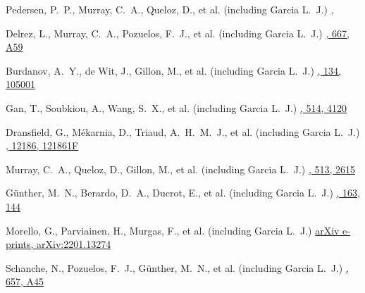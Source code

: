 {Pedersen, P.~P., Murray, C.~A., Queloz, D., et al. (including Garcia L.~J.)}
{\href{https://ui.adsabs.harvard.edu/abs/2022MNRAS.tmp.2950P}{\mnras,}}

{Delrez, L., Murray, C.~A., Pozuelos, F.~J., et al. (including Garcia L.~J.)}
{\href{https://ui.adsabs.harvard.edu/abs/2022A\&A...667A..59D}{\aap, 667, A59}}

{Burdanov, A.~Y., de Wit, J., Gillon, M., et al. (including Garcia L.~J.)}
{\href{https://ui.adsabs.harvard.edu/abs/2022PASP..134j5001B}{\pasp, 134, 105001}}

{Gan, T., Soubkiou, A., Wang, S.~X., et al. (including Garcia L.~J.)}
{\href{https://ui.adsabs.harvard.edu/abs/2022MNRAS.514.4120G}{\mnras, 514, 4120}}

{Dransfield, G., M{\'e}karnia, D., Triaud, A.~H.~M.~J., et al. (including Garcia L.~J.)}
{\href{https://ui.adsabs.harvard.edu/abs/2022SPIE12186E..1FD}{\procspie, 12186, 121861F}}

{Murray, C.~A., Queloz, D., Gillon, M., et al. (including Garcia L.~J.)}
{\href{https://ui.adsabs.harvard.edu/abs/2022MNRAS.513.2615M}{\mnras, 513, 2615}}

{G{\"u}nther, M.~N., Berardo, D.~A., Ducrot, E., et al. (including Garcia L.~J.)}
{\href{https://ui.adsabs.harvard.edu/abs/2022AJ....163..144G}{\aj, 163, 144}}

{Morello, G., Parviainen, H., Murgas, F., et al. (including Garcia L.~J.)}
{\href{https://ui.adsabs.harvard.edu/abs/2022arXiv220113274M}{arXiv e-prints, arXiv:2201.13274}}

{Schanche, N., Pozuelos, F.~J., G{\"u}nther, M.~N., et al. (including Garcia L.~J.)}
{\href{https://ui.adsabs.harvard.edu/abs/2022A\&A...657A..45S}{\aap, 657, A45}}

